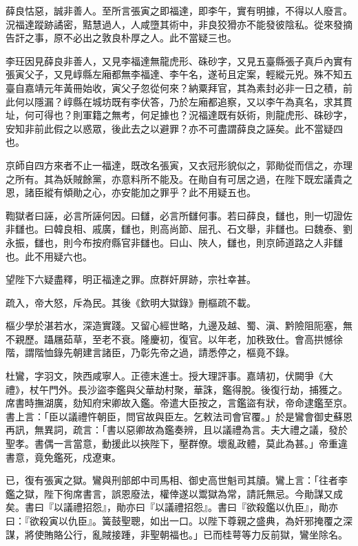 \begin{pinyinscope}
薛良怙惡，誠非善人。至所言張寅之即福達，即李午，實有明據，不得以人廢言。況福達蹤跡譎密，黠慧過人，人咸墮其術中，非良狡猾亦不能發彼陰私。從來發摘告訐之事，原不必出之敦良朴厚之人。此不當疑三也。

李玨因見薛良非善人，又見李福達無龍虎形、硃砂字，又見五臺縣張子真戶內實有張寅父子，又見崞縣左廂都無李福達、李午名，遂茍且定案，輕縱元兇。殊不知五臺自嘉靖元年黃冊始收，寅父子忽從何來？納粟拜官，其為素封必非一日之積，前此何以隱漏？崞縣在城坊既有李伏答，乃於左廂都追察，又以李午為真名，求其貫址，何可得也？則軍籍之無考，何足據也？況福達既有妖術，則龍虎形、硃砂字，安知非前此假之以惑眾，後此去之以避罪？亦不可盡謂薛良之誣矣。此不當疑四也。

京師自四方來者不止一福達，既改名張寅，又衣冠形貌似之，郭勛從而信之，亦理之所有。其為妖賊餘黨，亦意料所不能及。在勛自有可居之過，在陛下既宏議貴之恩，諸臣縱有傾勛之心，亦安能加之罪乎？此不用疑五也。

鞫獄者曰誣，必言所誣何因。曰讎，必言所讎何事。若曰薛良，讎也，則一切證佐非讎也。曰韓良相、戚廣，讎也，則高尚節、屈孔、石文舉，非讎也。曰魏泰、劉永振，讎也，則今布按府縣官非讎也。曰山、陜人，讎也，則京師道路之人非讎也。此不用疑六也。

望陛下六疑盡釋，明正福達之罪。庶群奸屏跡，宗社幸甚。

疏入，帝大怒，斥為民。其後《欽明大獄錄》刪樞疏不載。

樞少學於湛若水，深造實踐。又留心經世略，九邊及越、蜀、滇、黔險阻阨塞，無不親歷。躡屩茹草，至老不衰。隆慶初，復官。以年老，加秩致仕。會高拱憾徐階，謂階恤錄先朝建言諸臣，乃彰先帝之過，請悉停之，樞竟不錄。

杜鸞，字羽文，陜西咸寧人。正德末進士。授大理評事。嘉靖初，伏闕爭《大禮》，杖午門外。長沙盜李鑑與父華劫村聚，華誅，鑑得脫。後復行劫，捕獲之。席書時撫湖廣，劾知府宋卿故入鑑。帝遣大臣按之，言鑑盜有狀，帝命逮鑑至京。書上言：「臣以議禮忤朝臣，問官故與臣左。乞敕法司會官覆。」於是鸞會御史蘇恩再訊，無異詞，疏言：「書以惡卿故為鑑奏辨，且以議禮為言。夫大禮之議，發於聖孝。書偶一言當意，動援此以挾陛下，壓群僚。壞亂政體，莫此為甚。」帝重違書意，竟免鑑死，戍遼東。

已，復有張寅之獄。鸞與刑部郎中司馬相、御史高世魁司其牘。鸞上言：「往者李鑑之獄，陛下徇席書言，誤恩廢法，權倖遂以鬻獄為常，請託無忌。今勛謀又成矣。書曰『以議禮招怨』，勛亦曰『以議禮招怨』。書曰『欲殺鑑以仇臣』，勛亦曰：『欲殺寅以仇臣』。簧鼓聖聰，如出一口。以陛下尊親之盛典，為奸邪掩覆之深謀，將使賄賂公行，亂賊接踵，非聖朝福也。」已而桂萼等力反前獄，鸞坐除名。


\end{pinyinscope}

